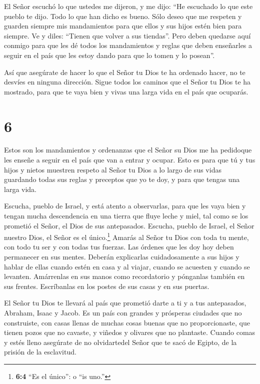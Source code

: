  El Señor escuchó lo que ustedes me dijeron, y me dijo:
``He escuchado lo que este pueblo te dijo. Todo lo que han dicho es
bueno.  Sólo deseo que me respeten y guarden siempre mis
mandamientos para que ellos y sus hijos estén bien para siempre.
 Ve y diles: ``Tienen que volver a sus tiendas''.
 Pero deben quedarse aquí conmigo para que les dé todos los
mandamientos y reglas que deben enseñarles a seguir en el país que les
estoy dando para que lo tomen y lo posean''.

 Así que asegúrate de hacer lo que el Señor tu Dios te ha
ordenado hacer, no te desvíes en ninguna dirección.  Sigue
todos los caminos que el Señor tu Dios te ha mostrado, para que te vaya
bien y vivas una larga vida en el país que ocuparás.

\hypertarget{section-5}{%
\section{6}\label{section-5}}

 Estos son los mandamientos y ordenanzas que el Señor su
Dios me ha pedidoque les enseñe a seguir en el país que van a entrar y
ocupar.  Esto es para que tú y tus hijos y nietos muestren
respeto al Señor tu Dios a lo largo de sus vidas guardando todas sus
reglas y preceptos que yo te doy, y para que tengas una larga vida.

 Escucha, pueblo de Israel, y está atento a observarlas,
para que les vaya bien y tengan mucha descendencia en una tierra que
fluye leche y miel, tal como se los prometió el Señor, el Dios de sus
antepasados.  Escucha, pueblo de Israel, el Señor nuestro
Dios, el Señor es el único.\footnote{\textbf{6:4} ``Es el único'': o
  ``is uno.''}  Amarás al Señor tu Dios con toda tu mente,
con todo tu ser y con todas tus fuerzas.  Las órdenes que
les doy hoy deben permanecer en sus mentes.  Deberán
explicarlas cuidadosamente a sus hijos y hablar de ellas cuando estén en
casa y al viajar, cuando se acuesten y cuando se levanten. 
Amárrenlas en sus manos como recordatorio y pónganlas también en sus
frentes.  Escríbanlas en los postes de sus casas y en sus
puertas.

 El Señor tu Dios te llevará al país que prometió darte a
ti y a tus antepasados, Abraham, Isaac y Jacob. Es un país con grandes y
prósperas ciudades que no construiste,  con casas llenas de
muchas cosas buenas que no proporcionaste, que tienen pozos que no
cavaste, y viñedos y olivares que no plantaste. Cuando comas y estés
lleno  asegúrate de no olvidartedel Señor que te sacó de
Egipto, de la prisión de la esclavitud.


